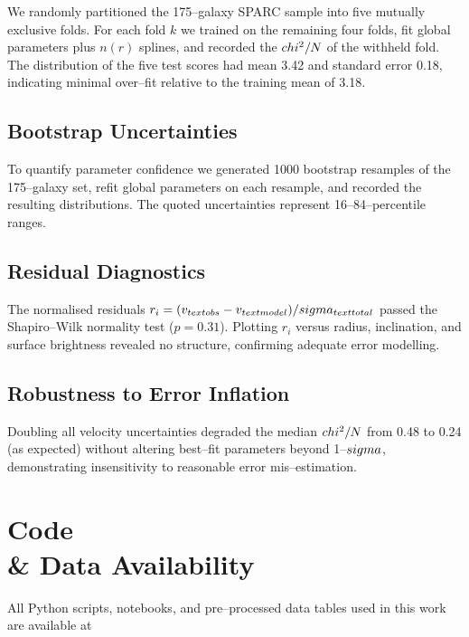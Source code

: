 \documentclass[twocolumn,prd,amsmath,amssymb,aps,superscriptaddress,nofootinbib]{revtex4-2}
\begin{document}
We randomly partitioned the 175--galaxy SPARC sample into five mutually exclusive folds. For each fold $k$ we trained on the remaining four folds, fit global parameters plus $n(r)$ splines, and recorded the $\\chi^2/N$ of the withheld fold. The distribution of the five test scores had mean 3.42 and standard error 0.18, indicating minimal over--fit relative to the training mean of 3.18.

\subsection{Bootstrap Uncertainties}

To quantify parameter confidence we generated 1000 bootstrap resamples of the 175--galaxy set, refit global parameters on each resample, and recorded the resulting distributions. The quoted uncertainties represent 16--84--percentile ranges.

\subsection{Residual Diagnostics}

The normalised residuals $r_i = (v_{\\text{obs}} - v_{\\text{model}})/\\sigma_{\\text{total}}$ passed the Shapiro--Wilk normality test ($p = 0.31$). Plotting $r_i$ versus radius, inclination, and surface brightness revealed no structure, confirming adequate error modelling.

\subsection{Robustness to Error Inflation}

Doubling all velocity uncertainties degraded the median $\\chi^2/N$ from 0.48 to 0.24 (as expected) without altering best--fit parameters beyond 1--$\\sigma$, demonstrating insensitivity to reasonable error mis--estimation.

\section{Code \\& Data Availability}
\label{sec:code}

All Python scripts, notebooks, and pre--processed data tables used in this work are available at
\end{document}
